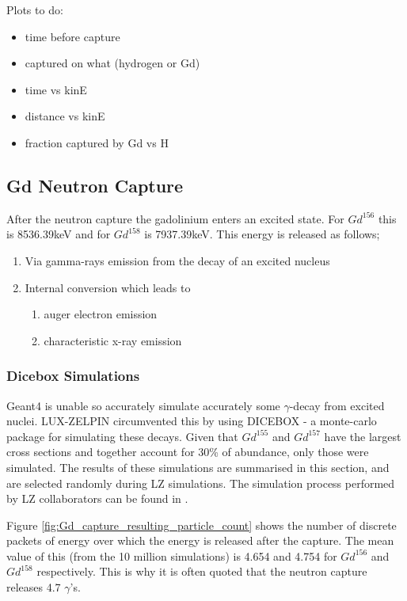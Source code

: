 \par
Plots to do:

\begin{itemize}
    \item time before capture
    \item captured on what (hydrogen or Gd)
    \item time vs kinE
    \item distance vs kinE
    \item fraction captured by Gd vs H
\end{itemize}


\subsection{Gd Neutron Capture}
\par
After the neutron capture the gadolinium enters an excited state. 
For $Gd^{156}$ this is 8536.39keV and for $Gd^{158}$ is 7937.39keV.
This energy is released as follows;

\begin{enumerate}
    \item Via gamma-rays emission from the decay of an excited nucleus
    \item Internal conversion which leads to
    \begin{enumerate}
        \item auger electron emission
        \item characteristic x-ray emission
    \end{enumerate}
\end{enumerate}


\subsubsection{Dicebox Simulations}
\par
Geant4 is unable so accurately simulate accurately some $\gamma$-decay from excited nuclei.
LUX-ZELPIN circumvented this by using DICEBOX - a monte-carlo package for simulating these decays.
Given that $Gd^{155}$ and $Gd^{157}$ have the largest cross sections and together account for 30\% of abundance, only those were simulated.
The results of these simulations are summarised in this section, and are selected randomly during LZ simulations.
The simulation process performed by LZ collaborators can be found in \cite{ucsb_gdls_dicebox_simulations_ref}.

\par
Figure \ref{fig:Gd_capture_resulting_particle_count} shows the number of discrete packets of energy over which the energy is released after the capture.
The mean value of this (from the 10 million simulations) is 4.654 and 4.754 for $Gd^{156}$ and $Gd^{158}$ respectively.
This is why it is often quoted that the neutron capture releases 4.7 $\gamma$'s.

